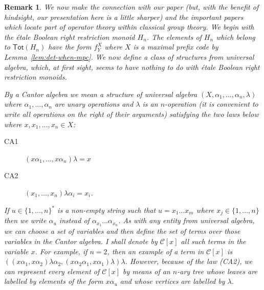 \documentclass[a4paper]{amsart}
\newtheorem{remark}[theorem]{Remark}
\begin{document}
\begin{remark}{\em We now make the connection with our paper \cite{Lawson2021b} (but, with the benefit of hindsight, our presentation here is a little sharper)
and the important papers \cite{G1, G2} which locate part of operator theory
within classical group theory.
We begin with the \'etale Boolean right restriction monoid $H_{n}$.
The elements of $H_{n}$ which belong to $\mathsf{Tot}(H_{n})$ have the form
$f^{X}_{Y}$ where $X$ is a maximal prefix code by Lemma~\ref{lem:det-when-mpc}.
We now define a class of structures from universal algebra,
which, at first sight, seems to have nothing to do with \'etale Boolean right restriction monoids.

By a {\em Cantor algebra} we mean a structure of universal algebra $(X,\alpha_{1}, \ldots, \alpha_{n}, \lambda)$
where $\alpha_{1}, \ldots, \alpha_{n}$ are unary operations and $\lambda$ is an $n$-operation 
(it is convenient to write all operations on the right of their arguments) 
satisfying the two laws below where $x,x_{1}, \ldots, x_{n} \in X$:
\begin{description}
\item[CA1] $(x\alpha_{1}, \ldots, x\alpha_{n}) \lambda = x$
\item[CA2] $(x_{1}, \ldots, x_{n})\lambda \alpha_{i} = x_{i}$. 
\end{description}
If $u \in \{1, \ldots, n\}^{\ast}$ is a non-empty string such that $u = x_{1} \ldots x_{m}$
where $x_{j} \in \{1, \ldots, n\}$ then we write $\alpha_{u}$ instead of $\alpha_{x_{1}} \ldots \alpha_{x_{n}}$.
As with any entity from universal algebra, we can choose a set of variables
and then define the set of terms over those variables in the Cantor algebra.
I shall denote by $\mathcal{C}[x]$ all such terms in the variable $x$.
For example, if $n = 2$, then an example of a  term in $\mathcal{C}[x]$  is $((x\alpha_{1}, x\alpha_{2})\lambda \alpha_{2}, (x\alpha_{2}\alpha_{1}, x\alpha_{1})\lambda ) \lambda$. 
However, because of the law (CA2), we can represent every element of  $\mathcal{C}[x]$ 
by means of an  $n$-ary tree whose leaves are labelled by elements of the form $x\alpha_{u}$
and whose vertices are labelled by $\lambda$.

}
\end{remark}
\end{document}
